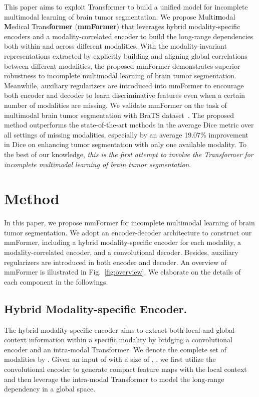 \documentclass[runningheads]{llncs}
\begin{document}
This paper aims to exploit Transformer to build a unified model for incomplete multimodal learning of brain tumor segmentation. We propose Multi\textbf{m}odal \textbf{M}edical Trans\textbf{former} (\textbf{mmFormer}) that leverages hybrid modality-specific encoders and a modality-correlated encoder to build the long-range dependencies both within and across different modalities. With the modality-invariant representations extracted by explicitly building and aligning global correlations between different modalities, the proposed mmFormer demonstrates superior robustness to incomplete multimodal learning of brain tumor segmentation. Meanwhile, auxiliary regularizers are introduced into mmFormer to encourage both encoder and decoder to learn discriminative features even when a certain number of modalities are missing. We validate mmFormer on the task of multimodal brain tumor segmentation with BraTS  dataset~\cite{menze2014multimodal}. The proposed method outperforms the state-of-the-art methods in the average Dice metric over all settings of missing modalities, especially by an average 19.07\% improvement in Dice on enhancing tumor segmentation with only one available modality. To the best of our knowledge, \textit{this is the first attempt to involve the Transformer for incomplete multimodal learning of brain tumor segmentation}.

\section{Method}
\label{sec:method}

In this paper, we propose mmFormer for incomplete multimodal learning of brain tumor segmentation. We adopt an encoder-decoder architecture to construct our mmFormer, including a hybrid modality-specific encoder for each modality, a modality-correlated encoder, and a convolutional decoder. Besides, auxiliary regularizers are introduced in both encoder and decoder. An overview of mmFormer is illustrated in Fig.~\ref{fig:overview}. We elaborate on the details of each component in the followings.



\subsection{Hybrid Modality-specific Encoder.} 
The hybrid modality-specific encoder aims to extract both local and global context information within a specific modality by bridging a convolutional encoder and an intra-modal Transformer. We denote the complete set of modalities by . Given an input of  with a size of , , we first utilize the convolutional encoder to generate compact feature maps with the local context and then leverage the intra-modal Transformer to model the long-range dependency in a global space.
\end{document}
